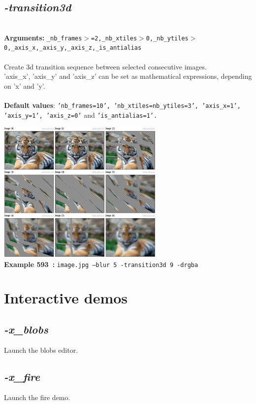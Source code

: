 \documentclass[a4paper,11pt,twoside]{book}
\begin{document}
\subsection{\emph{-transition3d} }\vspace*{-0.5em}
~\\\textbf{Arguments: } 
{\small \texttt{\_nb\_frames$>$=2,\_nb\_xtiles$>$0,\_nb\_ytiles$>$0,\_axis\_x,\_axis\_y,\_axis\_z,\_is\_antialias}}\\~\\
Create 3d transition sequence between selected consecutive images.
~\\'axis\_x', 'axis\_y' and 'axis\_z' can be set as mathematical expressions, depending on 'x' and 'y'.
~\\~\\\textbf{Default values}: {\small \texttt{'nb\_frames=10', 'nb\_xtiles=nb\_ytiles=3', 'axis\_x=1', 'axis\_y=1', 'axis\_z=0'} and \texttt{'is\_antialias=1'.}}
\begin{center}\includegraphics[keepaspectratio=true,height=7cm,width=\textwidth]{img/gmic_def593.jpg}\\
{\footnotesize \textbf{Example 593~:} \texttt{image.jpg --blur 5 -transition3d 9 -drgba}}
\end{center}
\section{Interactive demos}


\subsection{\emph{-x\_blobs} }\vspace*{-0.5em}
Launch the blobs editor.


\subsection{\emph{-x\_fire} }\vspace*{-0.5em}
Launch the fire demo.
\end{document}
